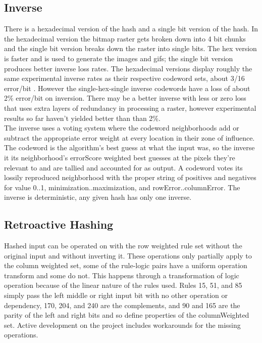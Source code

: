 \documentclass[11pt]{article}
\begin{document}
\subsection{Inverse}

There is a hexadecimal version of the hash and a single bit version of the hash. In the hexadecimal version the bitmap raster gets broken down into 4 bit chunks and the single bit version breaks down the raster into single bits. The hex version is faster and is used to generate the images and gifs; the single bit version produces better inverse loss rates. The hexadecimal versions display roughly the same experimental inverse rates as their respective codeword sets, about 3/16 error/bit . However the single-hex-single inverse codewords have a loss of about 2\% error/bit on inversion.  There may be a better inverse with less or zero loss that uses extra layers of redundancy in processing a raster, however experimental results so far haven't yielded better than than 2\%.\\

The inverse uses a voting system where the codeword neighborhoods add or subtract the appropriate error weight at every location in their zone of influence. The codeword is the algorithm's best guess at what the input was, so the inverse it its neighborhood's errorScore weighted best guesses at the pixels they're relevant to and are tallied and accounted for as output. A codeword votes its lossily reproduced neighborhood with the proper string of positives and negatives  for value 0..1, minimization..maximization, and rowError..columnError. The inverse is deterministic, any given hash has only one inverse.\\

\subsection{Retroactive Hashing}
Hashed input can be operated on with the row weighted rule set without the original input and without inverting it. These operations only partially apply to the column weighted set, some of the rule-logic pairs have a uniform operation transform and some do not. This happens through a transformation of logic operation because of the linear nature of the rules used. Rules 15, 51, and 85 simply pass the left middle or right input bit with no other operation or dependency, 170, 204, and 240 are the complements, and 90 and 165 are the parity of the left and right bits and so define properties of the columnWeighted set. Active development on the project includes workarounds for the missing operations.\\
\end{document}
